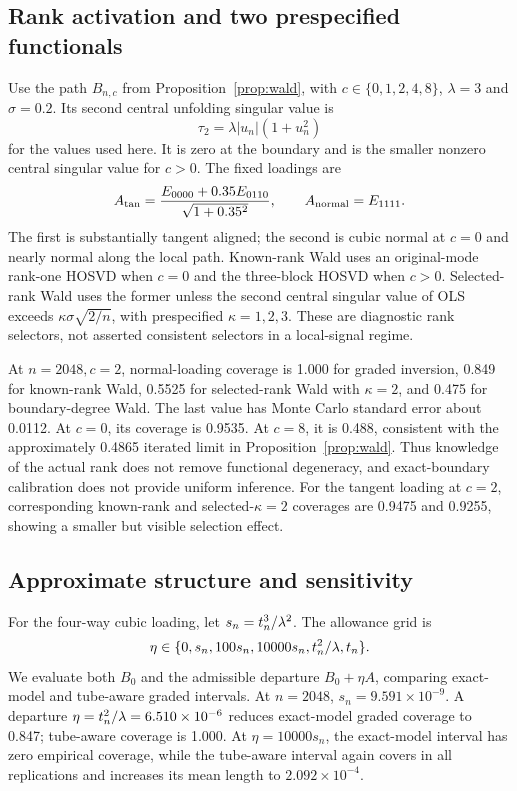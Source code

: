 \subsection{Rank activation and two prespecified functionals}
Use the path $B_{n,c}$ from Proposition~\ref{prop:wald}, with $c\in\{0,1,2,4,8\}$, $\lambda=3$ and $\sigma=0.2$. Its second central unfolding singular value is
\[
 \tau_2=\lambda|u_n|(1+u_n^2)
\]
for the values used here. It is zero at the boundary and is the smaller nonzero central singular value for $c>0$. The fixed loadings are
\[
 A_{\rm tan}=\frac{E_{0000}+0.35E_{0110}}{\sqrt{1+0.35^2}},
 \qquad A_{\rm normal}=E_{1111}.
\]
The first is substantially tangent aligned; the second is cubic normal at $c=0$ and nearly normal along the local path. Known-rank Wald uses an original-mode rank-one HOSVD when $c=0$ and the three-block HOSVD when $c>0$. Selected-rank Wald uses the former unless the second central singular value of OLS exceeds $\kappa\sigma\sqrt{2/n}$, with prespecified $\kappa=1,2,3$. These are diagnostic rank selectors, not asserted consistent selectors in a local-signal regime.

At $n=2048,c=2$, normal-loading coverage is 1.000 for graded inversion, 0.849 for known-rank Wald, 0.5525 for selected-rank Wald with $\kappa=2$, and 0.475 for boundary-degree Wald. The last value has Monte Carlo standard error about 0.0112. At $c=0$, its coverage is 0.9535. At $c=8$, it is 0.488, consistent with the approximately 0.4865 iterated limit in Proposition~\ref{prop:wald}. Thus knowledge of the actual rank does not remove functional degeneracy, and exact-boundary calibration does not provide uniform inference. For the tangent loading at $c=2$, corresponding known-rank and selected-$\kappa=2$ coverages are 0.9475 and 0.9255, showing a smaller but visible selection effect.

\subsection{Approximate structure and sensitivity}
For the four-way cubic loading, let $s_n=t_n^3/\lambda^2$. The allowance grid is
\[
 \eta\in\{0,s_n,100s_n,10000s_n,t_n^2/\lambda,t_n\}.
\] We evaluate both $B_0$ and the admissible departure $B_0+\eta A$, comparing exact-model and tube-aware graded intervals. At $n=2048$, $s_n=9.591\times10^{-9}$. A departure $\eta=t_n^2/\lambda=6.510\times10^{-6}$ reduces exact-model graded coverage to 0.847; tube-aware coverage is 1.000. At $\eta=10000s_n$, the exact-model interval has zero empirical coverage, while the tube-aware interval again covers in all replications and increases its mean length to $2.092\times10^{-4}$.

